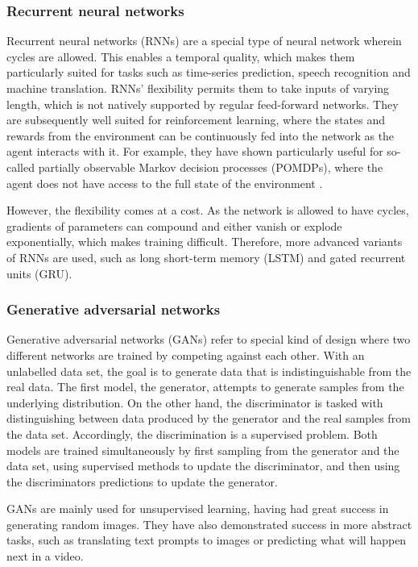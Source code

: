 \subsubsection{Recurrent neural networks}
\label{sec:rnn}
Recurrent neural networks (RNNs) are a special type of neural network wherein cycles are allowed.
This enables a temporal quality, which makes them particularly suited for tasks such as time-series prediction, speech recognition and machine translation.
RNNs' flexibility permits them to take inputs of varying length, which is not natively supported by regular feed-forward networks.
They are subsequently well suited for reinforcement learning, where the states and rewards from the environment can be continuously fed into the network as the agent interacts with it.
For example, they have shown particularly useful for so-called partially observable Markov decision processes (POMDPs), where the agent does not have access to the full state of the environment \autocite{arulkumaran2017}.

However, the flexibility comes at a cost.
As the network is allowed to have cycles, gradients of parameters can compound and either vanish or explode exponentially, which makes training difficult.
Therefore, more advanced variants of RNNs are used, such as long short-term memory (LSTM) and gated recurrent units (GRU).


\subsubsection{Generative adversarial networks}
Generative adversarial networks (GANs) refer to special kind of design where two different networks are trained by competing against each other.
With an unlabelled data set, the goal is to generate data that is indistinguishable from the real data.
The first model, the generator, attempts to generate samples from the underlying distribution.
On the other hand, the discriminator is tasked with distinguishing between data produced by the generator and the real samples from the data set.
Accordingly, the discrimination is a supervised problem.
Both models are trained simultaneously by first sampling from the generator and the data set, using supervised methods to update the discriminator, and then using the discriminators predictions to update the generator.

GANs are mainly used for unsupervised learning, having had great success in generating random images.
They have also demonstrated success in more abstract tasks, such as translating text prompts to images or predicting what will happen next in a video.